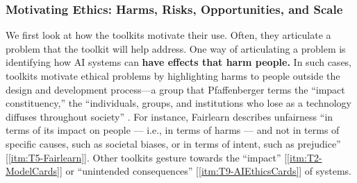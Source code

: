 \documentclass[acmsmall]{acmart}
\begin{document}
\subsubsection{Motivating Ethics: Harms, Risks, Opportunities, and Scale}
We first look at how the toolkits motivate their use. Often, they articulate a problem that the toolkit will help address.
One way of articulating a problem is identifying how AI systems can \textbf{have effects that harm people.} %
In such cases, toolkits motivate ethical problems by highlighting harms to people outside the design and development process---a group that Pfaffenberger terms the ``impact constituency,'' the ``individuals, groups, and institutions who lose as a technology diffuses throughout society'' \cite[p297]{Pfaffenberger1992}. 
For instance, Fairlearn describes unfairness ``in terms of its impact on people — i.e., in terms of harms — and not in terms of specific causes, such as societal biases, or in terms of intent, such as prejudice'' [\ref{itm:T5-Fairlearn}]. Other toolkits gesture towards the ``impact'' [\ref{itm:T2-ModelCards}] or ``unintended consequences'' [\ref{itm:T9-AIEthicsCards}] of systems. 
\end{document}
